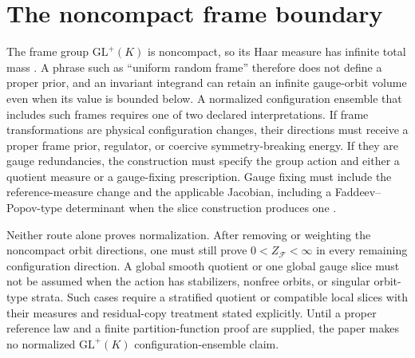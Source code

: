 \section{The noncompact frame boundary}

The frame group \(\mathrm{GL}^+(K)\) is noncompact, so its Haar measure has infinite total mass \citep{Knapp2002}. A phrase such as ``uniform random frame'' therefore does not define a proper prior, and an invariant integrand can retain an infinite gauge-orbit volume even when its value is bounded below. A normalized configuration ensemble that includes such frames requires one of two declared interpretations. If frame transformations are physical configuration changes, their directions must receive a proper frame prior, regulator, or coercive symmetry-breaking energy. If they are gauge redundancies, the construction must specify the group action and either a quotient measure or a gauge-fixing prescription. Gauge fixing must include the reference-measure change and the applicable Jacobian, including a Faddeev--Popov-type determinant when the slice construction produces one \citep{FaddeevPopov1967,Nakahara2003}.

Neither route alone proves normalization. After removing or weighting the noncompact orbit directions, one must still prove \(0<Z_{\mathcal F}<\infty\) in every remaining configuration direction. A global smooth quotient or one global gauge slice must not be assumed when the action has stabilizers, nonfree orbits, or singular orbit-type strata. Such cases require a stratified quotient or compatible local slices with their measures and residual-copy treatment stated explicitly. Until a proper reference law and a finite partition-function proof are supplied, the paper makes no normalized \(\mathrm{GL}^+(K)\) configuration-ensemble claim.
